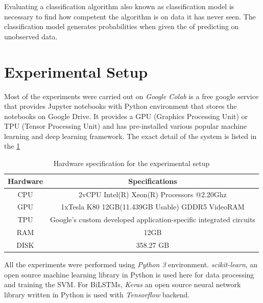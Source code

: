 \label{ch:evaluation}

Evaluating a classification algorithm also known as classification model is necessary to find how competent the algorithm is on data it has never seen. The classification model generates probabilities when given the of predicting on unobserved data. 

\section{Experimental Setup}
Most of the experiments were carried out on \textit{Google Colab} is a free google service that provides Jupyter notebooks with Python environment that stores the notebooks on Google Drive. It provides a GPU (Graphics Processing Unit) or TPU (Tensor Processing Unit) and has pre-installed various popular machine learning and deep learning framework. The exact detail of the system is listed in the \ref{table:HWsetup}

\begin{table}[!ht]
\centering
\begin{tabular}{cc}
\hline
\textbf{Hardware} & \textbf{Specifications} \\ \hline
CPU & 2vCPU Intel(R) Xeon(R) Processors @2.20Ghz \\
GPU & 1xTesla K80 12GB(11.439GB Usable) GDDR5  VideoRAM \\
TPU & \multicolumn{1}{l}{Google's custom developed application-specific integrated circuits} \\
RAM & 12GB \\
DISK & 358.27 GB \\ \hline
\end{tabular}
\caption{Hardware specification for the experimental setup}
\label{table:HWsetup}
\end{table}

All the experiments were performed using \textit{Python 3} environment. \textit{scikit-learn}, an open source machine learning library in Python is used here for data processing and training the SVM. For \glspl{BiLSTM}, \textit{Keras} an open source neural network library written in Python is used with \textit{Tensorflow} backend.  

